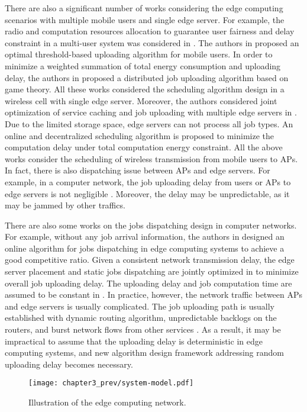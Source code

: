 There are also a significant number of works considering the edge computing scenarios with multiple mobile users and single edge server. For example, the radio and computation resources allocation to guarantee user fairness and delay constraint in a multi-user system was considered in \cite{Du2018}. The authors in \cite{KBHuang2016} proposed an optimal threshold-based uploading algorithm for mobile users. In order to minimize a weighted summation of total energy consumption and uploading delay, the authors in \cite{XuChen2016} proposed a distributed job uploading algorithm based on game theory. All these works considered the scheduling algorithm design in a wireless cell with single edge server. Moreover, the authors considered joint optimization of service caching and job uploading with multiple edge servers in \cite{jieXu2018}. 
Due to the limited storage space, edge servers can not process all job types.  An online and decentralized scheduling algorithm is proposed to minimize the computation delay under total computation energy constraint.
All the above works consider the scheduling of wireless transmission from mobile users to APs. In fact, there is also dispatching issue between APs and edge servers. For example, in a computer network, the job uploading delay from users or APs to edge servers is not negligible \cite{tan-online,liang2017}. Moreover, the delay may be unpredictable, as it may be jammed by other traffics.

There are also some works on the jobs dispatching design in computer networks. For example, without any job arrival information, the authors in \cite{tan-online} designed an online algorithm for jobs dispatching in edge computing systems to achieve a good competitive ratio. Given a consistent network transmission delay, the edge server placement and static jobs dispatching are jointly optimized in \cite{liang2017} to minimize overall job uploading delay. The uploading delay and job computation time are assumed to be constant in \cite{tan-online,liang2017}. 
In practice, however, the network traffic between APs and edge servers is usually complicated.
The job uploading path is usually established with dynamic routing algorithm, unpredictable backlogs on the routers, and burst network flows from other services \cite{liang2015}.
As a result, it may be impractical to assume that the uploading delay is deterministic in edge computing systems, and new algorithm design framework addressing random uploading delay becomes necessary.

\begin{figure*}
    \centering
    \texttt{[image: chapter3\_prev/system-model.pdf]}
    \caption{Illustration of the edge computing network.}
    \label{fig:ch3_prev-system}
\end{figure*}

